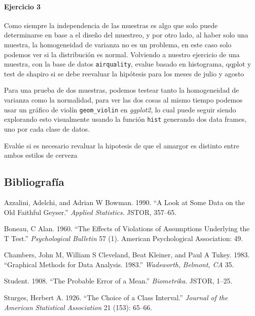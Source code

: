 \documentclass[]{article}
\let\oldparagraph\paragraph
\renewcommand{\paragraph}[1]{\oldparagraph{#1}\mbox{}}
\begin{document}
\paragraph{Ejercicio 3}\label{ejercicio-3}

Como siempre la independencia de las muestras es algo que solo puede
determinarse en base a el diseño del muestreo, y por otro lado, al haber
solo una muestra, la homogeneidad de varianza no es un problema, en este
caso solo podemos ver si la distribución es normal. Volviendo a nuestro
ejercicio de una muestra, con la base de datos \texttt{airquality},
evalue basado en histograma, qqplot y test de shapiro si se debe
reevaluar la hipótesis para los meses de julio y agosto

Para una prueba de dos muestras, podemos testear tanto la homogeneidad
de varianza como la normalidad, para ver las dos cosas al mismo tiempo
podemos usar un gráfico de violín \texttt{geom\_violin} en
\emph{ggplot2}, lo cual puede seguir siendo explorando esto visualmente
usando la función \texttt{hist} generando dos data frames, uno por cada
clase de datos.

Evalúe si es necesario revaluar la hipotesis de que el amargor es
distinto entre ambos estilos de cerveza

\subsection*{Bibliografía}\label{bibliografia}

\hypertarget{refs}{}
\hypertarget{ref-azzalini1990look}{}
Azzalini, Adelchi, and Adrian W Bowman. 1990. ``A Look at Some Data on
the Old Faithful Geyser.'' \emph{Applied Statistics}. JSTOR, 357--65.

\hypertarget{ref-boneau1960effects}{}
Boneau, C Alan. 1960. ``The Effects of Violations of Assumptions
Underlying the T Test.'' \emph{Psychological Bulletin} 57 (1). American
Psychological Association: 49.

\hypertarget{ref-chambers35graphical}{}
Chambers, John M, William S Cleveland, Beat Kleiner, and Paul A Tukey.
1983. ``Graphical Methods for Data Analysis. 1983.'' \emph{Wadsworth,
Belmont, CA} 35.

\hypertarget{ref-student1908probable}{}
Student. 1908. ``The Probable Error of a Mean.'' \emph{Biometrika}.
JSTOR, 1--25.

\hypertarget{ref-sturges1926choice}{}
Sturges, Herbert A. 1926. ``The Choice of a Class Interval.''
\emph{Journal of the American Statistical Association} 21 (153): 65--66.
\end{document}
